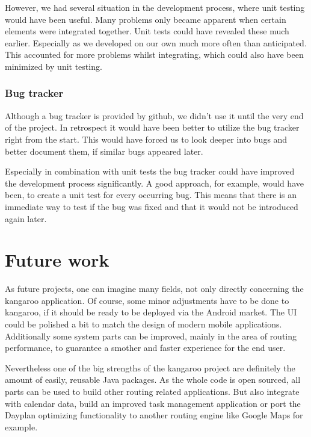However, we had several situation in the development process, where
unit testing would have been useful. Many problems only became
apparent when certain elements were integrated together. Unit tests
could have revealed these much earlier. Especially as we developed
on our own much more often than anticipated. This accounted for more
problems whilst integrating, which could also have been minimized by
unit testing.


\subsubsection{Bug tracker} %
\label{ssub:Bugtracker}
Although a bug tracker is provided by github, we didn't use it
until the very end of the project. In retrospect it would have been
better to utilize the bug tracker right from the start. This would
have forced us to look deeper into bugs and better document them, if
similar bugs appeared later.

Especially in combination with unit tests the bug tracker could have
improved the development process significantly. A good approach, for
example, would have been, to create a unit test for every occurring bug.
This means that there is an immediate way to test if the bug was
fixed and that it would not be introduced again later.

\section{Future work}
As future projects, one can imagine many fields, not only directly concerning
the kangaroo application. Of course, some minor adjustments have to be done to
kangaroo, if it should be ready to be deployed via the Android market. The UI
could be polished a bit to match the design of modern mobile applications.
Additionally some system parts can be improved, mainly in the area of routing
performance, to guarantee a smother and faster experience for the end user.

Nevertheless one of the big strengths of the kangaroo project are definitely the
amount of easily, reusable Java packages. As the whole code is open sourced, all
parts can be used to build other routing related applications. But also
integrate with calendar data, build an improved task management application or
port the Dayplan optimizing functionality to another routing engine like Google
Maps for example.
